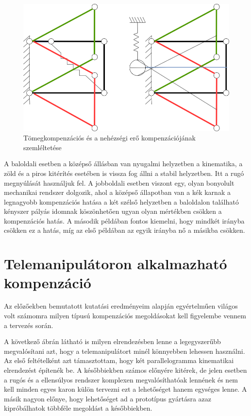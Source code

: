 \begin{figure}[!ht]
\centering
\includegraphics[width=125mm, keepaspectratio]{figures/Diagrammok/Tomeg_VS_Gravkomp}
\caption{Tömegkompenzációs és a nehézségi erő kompenzációjának szemléltetése}
\label{fig:Tomeg_VS_Gravkomp}
\end{figure}

A baloldali esetben a középső állásban van nyugalmi helyzetben a kinematika, a zöld  és a piros kitérítés esetében is vissza fog állni a stabil helyzetben. Itt a rugó megnyúlását használjuk fel. A jobboldali esetben viszont egy, olyan bonyolult mechanikai rendszer dolgozik, ahol a középső állapotban van a kék karnak a legnagyobb kompenzációs hatása a két szélső helyzetben a baloldalon található kényszer pályás idomnak köszönhetően ugyan olyan mértékben csökken a kompenzációs hatás. A második példában fontos kiemelni, hogy mindkét irányba csökken ez a hatás, míg az első példában az egyik irányba nő a másikba csökken.

\section{Telemanipulátoron alkalmazható kompenzáció}

Az előzőekben bemutatott kutatási eredményeim alapján egyértelműen világos volt számomra milyen típusú kompenzációs megoldásokat kell figyelembe vennem a tervezés során.

A következő ábrán látható is milyen elrendezésben lenne a legegyszerűbb megvalósítani azt, hogy a telemanipulátort minél könnyebben lehessen használni. Az első feltételként azt támasztottam, hogy két parallelogramma kinematikai elrendezést építenék be. A későbbiekben számos előnyére kitérek, de jelen esetben a rugós és a ellensúlyos rendszer komplexen megvalósíthatóak lennének és nem kell minden egyes karon külön tervezni ezt a lehetőséget hanem egységes lenne. A másik nagyon előnye, hogy lehetőséget ad a prototípus gyártásra azaz kipróbálhatok többféle megoldást a későbbiekben.

